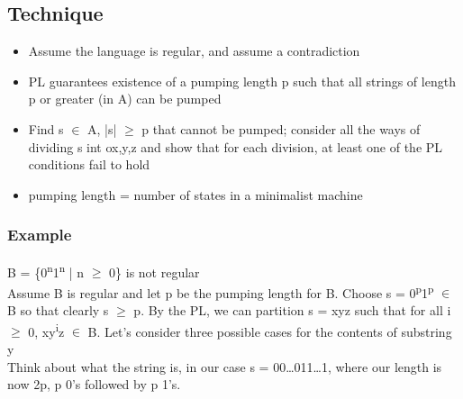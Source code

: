 \documentclass[11pt]{article}
\begin{document}
\subsection{Technique}
\label{sec:org985bb6d}
\begin{itemize}
\item Assume the language is regular, and assume a contradiction\\
\item PL guarantees existence of a pumping length p such that all strings of length p or greater (in A) can be pumped\\
\item Find s \(\in\) A, |s| \(\ge\) p that cannot be pumped; consider all the ways of dividing s int ox,y,z and show that for each division, at least one of the PL conditions fail to hold\\
\item pumping length = number of states in a minimalist machine\\
\end{itemize}
\subsubsection{Example}
\label{sec:org3cf5584}
B = \{0\textsuperscript{n}1\textsuperscript{n} | n \(\ge\) 0\} is not regular\\

Assume B is regular and let p be the pumping length for B. Choose s = 0\textsuperscript{p}1\textsuperscript{p} \(\in\) B so that clearly s \(\ge\) p. By the PL, we can partition s = xyz such that for all i \(\ge\) 0, xy\textsuperscript{i}z \(\in\) B. Let's consider three possible cases for the contents of substring y\\

Think about what the string is, in our case s = 00\ldots{}011\ldots{}1, where our length is now 2p, p 0's followed by p 1's.\\
\end{document}
